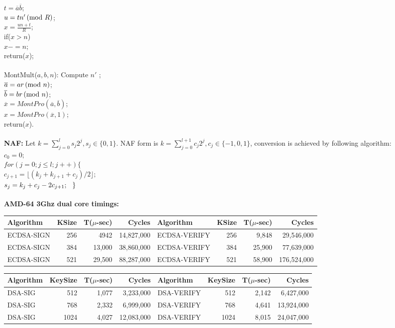 \jt \jt $t= {\overline a} {\overline b}$; \\
\jt \jt $u= tn' \thinspace \textnormal{(mod } R \textnormal{)}$; \\
\jt \jt $x= {\frac {un+t} R}$; \\
\jt \jt if($x>n$)  \\
\jt \jt \jt $x-=n$; \\
\jt \jt return($x$); \\
\\
\jt MontMult($a,b,n$): Compute $n'$ ;\\
\jt \jt ${\overline a}= a r \thinspace \textnormal{(mod } n \textnormal{)}$;\\
\jt \jt ${\overline b}= b r \thinspace \textnormal{(mod } n \textnormal{)}$;\\
\jt \jt ${\overline x}= MontPro({\overline a}, {\overline b})$;\\
\jt \jt $x= MontPro({\overline x}, 1)$;\\
\jt \jt return($x$).
\\
\\
{\bf NAF: } Let $k= \sum_{j=0}^l s_j 2^j, s_j \in \{0, 1\}$. NAF form is
$k= \sum_{j=0}^{l+1} c_j 2^j, c_j \in \{-1, 0, 1\}$, conversion is achieved
by following algorithm:\\
\jt $c_0 =0;$\\
\jt $for(j=0; j \le l; j++) \{$\\
\jt \jt $c_{j+1}= \lfloor (k_j + k_{j+1} +c_j) /2 \rfloor;$ \\
\jt \jt $s_{j}= k_j + c_j -2 c_{j+1}; \\
\hspace*{.25cm} \}$
\\
\\
{\bf AMD-64 3Ghz dual core timings: }
\begin{center}
\begin{tabular} {|l|rrr||l|rrr|}
\hline
{\bf Algorithm} & {\bf KSize} & {\bf T($\mu$-sec)} & {\bf Cycles} &
{\bf Algorithm} & {\bf KSize} & {\bf T($\mu$-sec)} & {\bf Cycles} \\
\hline
ECDSA-SIGN & 256 & 4942 & 14,827,000 &
ECDSA-VERIFY & 256 & 9,848 & 29,546,000 \\
ECDSA-SIGN & 384 & 13,000 & 38,860,000 &
ECDSA-VERIFY & 384 & 25,900 & 77,639,000 \\
ECDSA-SIGN & 521 & 29,500 & 88,287,000 &
ECDSA-VERIFY & 521 & 58,900 & 176,524,000 \\
\hline
\end{tabular}
\end{center}
\begin{center}
\begin{tabular} {|l|rrr||l|rrr|}
\hline
{\bf Algorithm} & {\bf KeySize} & {\bf T($\mu$-sec)} & {\bf Cycles} &
{\bf Algorithm} & {\bf KeySize} & {\bf T($\mu$-sec)} & {\bf Cycles} \\
\hline
DSA-SIG & 512 & 1,077 & 3,233,000 &
DSA-VERIFY & 512 & 2,142 & 6,427,000 \\
DSA-SIG	& 768 & 2,332 & 6,999,000 &
DSA-VERIFY & 768 & 4,641 & 13,924,000 \\
DSA-SIG	& 1024	& 4,027 & 12,083,000 &
DSA-VERIFY	& 1024 & 8,015 & 24,047,000 \\
\hline
\end{tabular}
\end{center}
